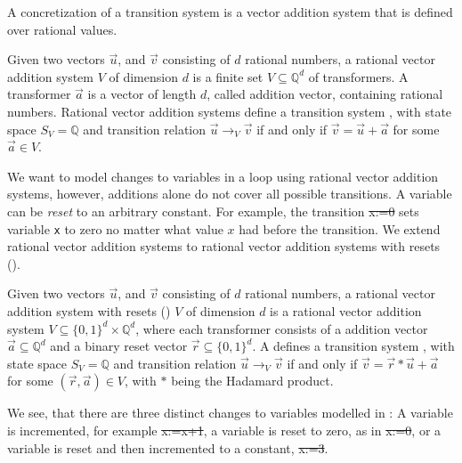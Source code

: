 A concretization of a transition system is a vector addition system that is defined over rational values.

\begin{mydef}
	Given two vectors $\vec{u}$, and $\vec{v}$ consisting of $d$ rational numbers, a rational vector addition system $V$ of dimension $d$ is a finite set $V \subseteq \mathbb{Q}^d$ of transformers. A transformer $\vec{a}$ is a vector of length $d$, called addition vector, containing rational numbers. Rational vector addition systems define a transition system , with state space $S_V = \mathbb{Q}$ and transition relation $\vec{u} \rightarrow_V \vec{v}$ if and only if $\vec{v} = \vec{u} + \vec{a}$ for some $\vec{a} \in V$. 
\end{mydef}
We want to model changes to variables in a loop using rational vector addition systems, however, additions alone do not cover all possible transitions. A variable can be \textsl{reset} to an arbitrary constant. For example, the transition \st{x:=0} sets variable \texttt{x} to zero no matter what value $x$ had before the transition. We extend rational vector addition systems to rational vector addition systems with resets (\qvasr).

\begin{mydef}
		Given two vectors $\vec{u}$, and $\vec{v}$ consisting of $d$ rational numbers, a rational vector addition system with resets (\qvasr) $V$ of dimension $d$ is a rational vector addition system $V \subseteq \{0, 1\}^d \times \mathbb{Q}^d$, where each transformer consists of a addition vector $\vec{a} \subseteq \mathbb{Q}^d$ and a binary reset vector $\vec{r} \subseteq \{0, 1\}^d$. A \qvasr defines a transition system , with state space $S_V = \mathbb{Q}$ and transition relation $\vec{u} \rightarrow_V \vec{v}$ if and only if $\vec{v} = \vec{r} * \vec{u} + \vec{a}$ for some $(\vec{r}, \vec{a}) \in V$, with $*$ being the Hadamard product.
\end{mydef}
We see, that there are three distinct changes to variables modelled in \qvasr: A variable is incremented, for example \st{x:=x+1}, a variable is reset to zero, as in \st{x:=0}, or a variable is reset and then incremented to a constant, \st{x:=3}. \par

